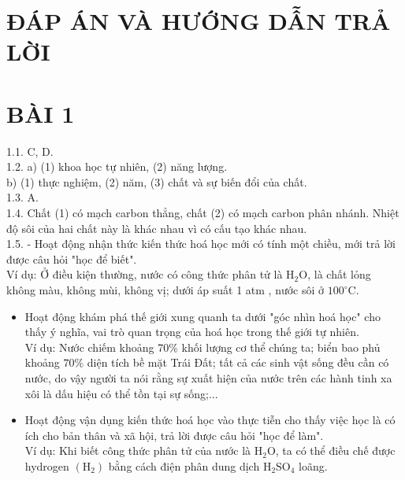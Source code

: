 \documentclass[10pt]{article}
\begin{document}
\section*{ĐÁP ÁN VÀ HƯỚNG DẪN TRẢ LỜI}
\section*{BÀI 1}
1.1. C, D.\\
1.2. a) (1) khoa học tự nhiên, (2) năng lượng.\\
b) (1) thực nghiệm, (2) năm, (3) chất và sự biến đổi của chất.\\
1.3. A.\\
1.4. Chất (1) có mạch carbon thẳng, chất (2) có mạch carbon phân nhánh. Nhiệt độ sôi của hai chất này là khác nhau vì có cấu tạo khác nhau.\\
1.5. - Hoạt động nhận thức kiến thức hoá học mới có tính một chiều, mới trả lời được câu hỏi "học để biết".\\
Ví dụ: Ở điều kiện thường, nước có công thức phân tử là $\mathrm{H}_{2} \mathrm{O}$, là chất lỏng không màu, không mùi, không vị; dưới áp suất 1 atm , nước sôi ở $100^{\circ} \mathrm{C}$.

\begin{itemize}
  \item Hoạt động khám phá thế giới xung quanh ta dưới "góc nhìn hoá học" cho thấy ý nghĩa, vai trò quan trọng của hoá học trong thế giới tự nhiên.\\
Ví dụ: Nước chiếm khoảng 70\% khối lượng cơ thể chúng ta; biển bao phủ khoảng $70 \%$ diện tích bề mặt Trái Đất; tất cả các sinh vật sống đều cần có nước, do vậy người ta nói rằng sự xuất hiện của nước trên các hành tinh xa xôi là dấu hiệu có thể tồn tại sự sống;...
  \item Hoạt động vận dụng kiến thức hoá học vào thực tiễn cho thấy việc học là có ích cho bản thân và xã hội, trả lời được câu hỏi "học để làm".\\
Ví dụ: Khi biết công thức phân tử của nước là $\mathrm{H}_{2} \mathrm{O}$, ta có thể điều chế được hydrogen $\left(\mathrm{H}_{2}\right)$ bằng cách điện phân dung dịch $\mathrm{H}_{2} \mathrm{SO}_{4}$ loãng.
\end{itemize}
\end{document}
